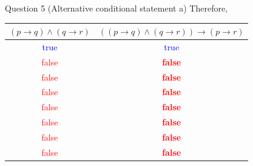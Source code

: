 \documentclass[10pt]{beamer}
\begin{document}
\begin{frame}[fragile]{Question 5 (Alternative conditional statement a)}
Therefore,
\begin{table}
\centering
\begin{tabular}{|c|c|} 
\hline
$(p \rightarrow q) \land (q \rightarrow r)$  & $((p \rightarrow q) \land (q \rightarrow r)) \rightarrow (p \rightarrow r) $   \\ 
\hline
\textcolor{blue}{true}                       & \textcolor{blue}{true}                                                         \\ 
\hline
\textcolor{red}{false}                       & \textbf{\textcolor{red}{false}}                                                \\ 
\hline
\textcolor{red}{false}                       & \textbf{\textcolor{red}{false}}                                                \\ 
\hline
\textcolor{red}{false}                       & \textbf{\textcolor{red}{false}}                                                \\ 
\hline
\textcolor{red}{false}                       & \textbf{\textcolor{red}{false}}                                                \\ 
\hline
\textcolor{red}{false}                       & \textbf{\textcolor{red}{false}}                                                \\ 
\hline
\textcolor{red}{false}                       & \textbf{\textcolor{red}{false}}                                                \\ 
\hline
\textcolor{red}{false}                       & \textbf{\textcolor{red}{false}}                                                \\
\hline
\end{tabular}
\end{table}
\end{frame}
\end{document}

